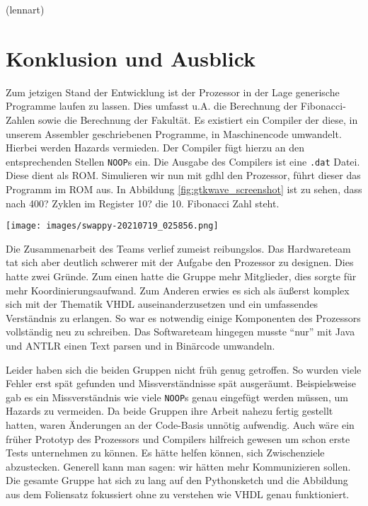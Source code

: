 \documentclass[paper=a4,fontsize=12pt,twocolumn]{scrreprt}
\begin{document}
(lennart)

\chapter{Konklusion und Ausblick}
\label{ch:konklusion_und_ausblick}
Zum jetzigen Stand der Entwicklung ist der Prozessor in der Lage generische Programme laufen zu lassen.
Dies umfasst u.A. die Berechnung der Fibonacci-Zahlen sowie die Berechnung der Fakultät.
Es existiert ein Compiler der diese, in unserem Assembler geschriebenen Programme, in Maschinencode umwandelt.
Hierbei werden Hazards vermieden.
Der Compiler fügt hierzu an den entsprechenden Stellen \texttt{NOOP}s ein.
Die Ausgabe des Compilers ist eine \texttt{.dat} Datei.
Diese dient als ROM.
Simulieren wir nun mit gdhl den Prozessor, führt dieser das Programm im ROM aus.
In Abbildung \ref{fig:gtkwave_screenshot} ist zu sehen, dass nach 400? Zyklen im Register 10? die 10. Fibonacci Zahl steht.

\begin{figure*}[t]
    \centering
    \texttt{[image: images/swappy-20210719\_025856.png]}
    \caption{GTKWave mit dem finalen Resultat des Fibonacci-Programms}
    \label{fig:gtkwave_screenshot}
\end{figure*}

Die Zusammenarbeit des Teams verlief zumeist reibungslos.
Das Hardwareteam tat sich aber deutlich schwerer mit der Aufgabe den Prozessor zu designen.
Dies hatte zwei Gründe.
Zum einen hatte die Gruppe mehr Mitglieder, dies sorgte für mehr Koordinierungsaufwand.
Zum Anderen erwies es sich als äußerst komplex sich mit der Thematik VHDL auseinanderzusetzen und ein umfassendes Verständnis zu erlangen.
So war es notwendig einige Komponenten des Prozessors vollständig neu zu schreiben.
Das Softwareteam hingegen musste \enquote{nur} mit Java und ANTLR einen Text parsen und in Binärcode umwandeln.

Leider haben sich die beiden Gruppen nicht früh genug getroffen.
So wurden viele Fehler erst spät gefunden und Missverständnisse spät ausgeräumt.
Beispielsweise gab es ein Missverständnis wie viele \texttt{NOOP}s genau eingefügt werden müssen, um Hazards zu vermeiden.
Da beide Gruppen ihre Arbeit nahezu fertig gestellt hatten, waren Änderungen an der Code-Basis unnötig aufwendig.
Auch wäre ein früher Prototyp des Prozessors und Compilers hilfreich gewesen um schon erste Tests unternehmen zu können.
Es hätte helfen können, sich Zwischenziele abzustecken.
Generell kann man sagen: wir hätten mehr Kommunizieren sollen.
Die gesamte Gruppe hat sich zu lang auf den Pythonsketch und die Abbildung aus dem Foliensatz fokussiert ohne zu verstehen wie VHDL genau funktioniert.
\end{document}
